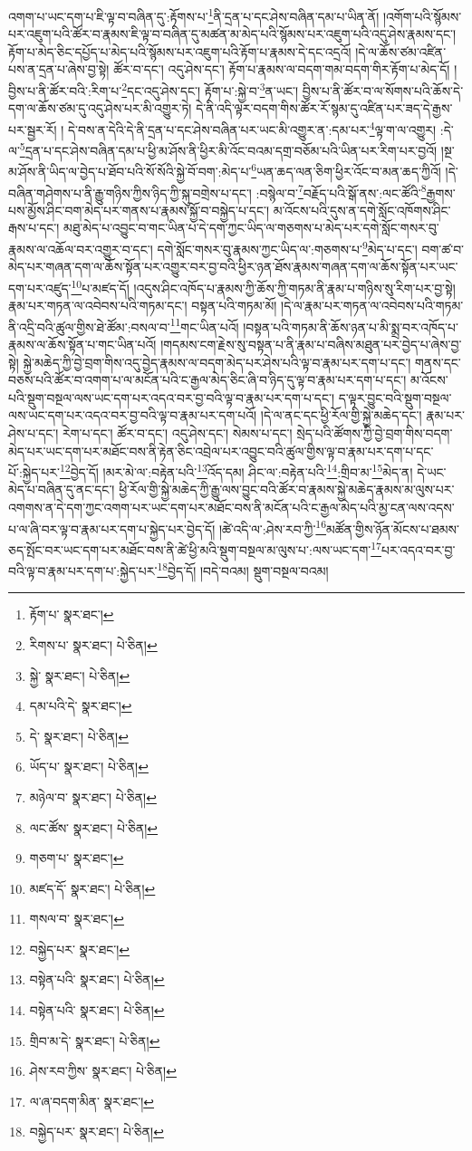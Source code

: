 འགག་པ་ཡང་དག་པ་ཇི་ལྟ་བ་བཞིན་དུ་:རྟོགས་པ་\footnote{རྟོག་པ་  སྣར་ཐང་། }ནི་དྲན་པ་དང་ཤེས་བཞིན་དམ་པ་ཡིན་ནོ། །འགོག་པའི་སྙོམས་པར་འཇུག་པའི་ཚོར་བ་རྣམས་ཇི་ལྟ་བ་བཞིན་དུ་མཚན་མ་མེད་པའི་སྙོམས་པར་འཇུག་པའི་འདུ་ཤེས་རྣམས་དང་། རྟོག་པ་མེད་ཅིང་དཔྱོད་པ་མེད་པའི་སྙོམས་པར་འཇུག་པའི་རྟོག་པ་རྣམས་དེ་དང་འདྲའོ། །དེ་ལ་ཆོས་ཙམ་འཛིན་པས་ན་དྲན་པ་ཞེས་བྱ་སྟེ། ཚོར་བ་དང་། འདུ་ཤེས་དང་། རྟོག་པ་རྣམས་ལ་བདག་གམ་བདག་གིར་རྟོག་པ་མེད་དོ། །བྱིས་པ་ནི་ཚོར་བའི་:རིག་པ་\footnote{རིགས་པ་  སྣར་ཐང་།  པེ་ཅིན། }དང་འདུ་ཤེས་དང་། རྟོག་པ་:སྐྱེ་བ་\footnote{སྐྱེ་  སྣར་ཐང་།  པེ་ཅིན། }ན་ཡང་། བྱིས་པ་ནི་ཚོར་བ་ལ་སོགས་པའི་ཆོས་དེ་དག་ལ་ཆོས་ཙམ་དུ་འདུ་ཤེས་པར་མི་འགྱུར་ཏེ། དེ་ནི་འདི་ལྟར་བདག་གིས་ཚོར་རོ་སྙམ་དུ་འཛིན་པར་ཟད་དེ་རྒྱས་པར་སྦྱར་རོ། །
དེ་བས་ན་དེའི་དེ་ནི་དྲན་པ་དང་ཤེས་བཞིན་པར་ཡང་མི་འགྱུར་ན་:དམ་པར་\footnote{དམ་པའི་དེ་  སྣར་ཐང་། }ལྟ་ག་ལ་འགྱུར། :དེ་ལ་\footnote{དེ་  སྣར་ཐང་།  པེ་ཅིན། }དྲན་པ་དང་ཤེས་བཞིན་དམ་པ་ཕྱི་མ་ཤོས་ནི་ཕྱིར་མི་འོང་བའམ་དགྲ་བཅོམ་པའི་ཡིན་པར་རིག་པར་བྱའོ། །སྔ་མ་ཤོས་ནི་ཡིད་ལ་བྱེད་པ་ཐོབ་པའི་སོ་སོའི་སྐྱེ་བོ་བག་:མེད་པ་\footnote{ཡོད་པ་  སྣར་ཐང་།  པེ་ཅིན། }ཡན་ཆད་ལན་ཅིག་ཕྱིར་འོང་བ་མན་ཆད་ཀྱིའོ། །དེ་བཞིན་གཤེགས་པ་ནི་རྒྱུ་གཉིས་ཀྱིས་ཉིད་ཀྱི་སྐུ་བགྲེས་པ་དང་། :བསྙེལ་བ་\footnote{མཉེལ་བ་  སྣར་ཐང་།  པེ་ཅིན། }བརྗོད་པའི་སྒོ་ནས་:ལང་ཚོའི་\footnote{ལང་ཚོས་  སྣར་ཐང་།  པེ་ཅིན། }རྒྱགས་པས་མྱོས་ཤིང་བག་མེད་པར་གནས་པ་རྣམས་སྐྱོ་བ་བསྐྱེད་པ་དང་། མ་འོངས་པའི་དུས་ན་དགེ་སློང་འཁོགས་ཤིང་རྒས་པ་དང་། མཐུ་མེད་པ་འབྱུང་བ་གང་ཡིན་པ་དེ་དག་ཀྱང་ཡིད་ལ་གཅགས་པ་མེད་པར་དགེ་སློང་གསར་བུ་རྣམས་ལ་འཆོལ་བར་འགྱུར་བ་དང་། དགེ་སློང་གསར་བུ་རྣམས་ཀྱང་ཡིད་ལ་:གཅགས་པ་\footnote{གཅག་པ་  སྣར་ཐང་། }མེད་པ་དང་། བག་ཚ་བ་མེད་པར་གཞན་དག་ལ་ཆོས་སྟོན་པར་འགྱུར་བར་བྱ་བའི་ཕྱིར་ཉན་ཐོས་རྣམས་གཞན་དག་ལ་ཆོས་སྟོན་པར་ཡང་དག་པར་འཛུད་\footnote{མཛད་དོ་  སྣར་ཐང་།  པེ་ཅིན། }པ་མཛད་དོ། །འདུས་ཤིང་འཁོད་པ་རྣམས་ཀྱི་ཆོས་ཀྱི་གཏམ་ནི་རྣམ་པ་གཉིས་སུ་རིག་པར་བྱ་སྟེ། རྣམ་པར་གཏན་ལ་འབེབས་པའི་གཏམ་དང་། བསྟན་པའི་གཏམ་མོ། །དེ་ལ་རྣམ་པར་གཏན་ལ་འབེབས་པའི་གཏམ་ནི་འདྲི་བའི་ཚུལ་གྱིས་ཐེ་ཚོམ་:བསལ་བ་\footnote{གསལ་བ་  སྣར་ཐང་། }གང་ཡིན་པའོ། །བསྟན་པའི་གཏམ་ནི་ཆོས་ཉན་པ་མི་སྨྲ་བར་འཁོད་པ་རྣམས་ལ་ཆོས་སྟོན་པ་གང་ཡིན་པའོ། །གདམས་ངག་རྗེས་སུ་བསྟན་པ་ནི་རྣམ་པ་བཞིས་མཐུན་པར་བྱེད་པ་ཞེས་བྱ་སྟེ། སྐྱེ་མཆེད་ཀྱི་བྱེ་བྲག་གིས་འདུ་བྱེད་རྣམས་ལ་བདག་མེད་པར་ཤེས་པའི་ལྟ་བ་རྣམ་པར་དག་པ་དང་། གནས་དང་བཅས་པའི་ཚོར་བ་འགག་པ་ལ་མངོན་པའི་ང་རྒྱལ་མེད་ཅིང་ཞི་བ་ཉིད་དུ་ལྟ་བ་རྣམ་པར་དག་པ་དང་། མ་འོངས་པའི་སྡུག་བསྔལ་ལས་ཡང་དག་པར་འདའ་བར་བྱ་བའི་ལྟ་བ་རྣམ་པར་དག་པ་དང་། ད་ལྟར་བྱུང་བའི་སྡུག་བསྔལ་ལས་ཡང་དག་པར་འདའ་བར་བྱ་བའི་ལྟ་བ་རྣམ་པར་དག་པའོ། །དེ་ལ་ནང་དང་ཕྱི་རོལ་གྱི་སྐྱེ་མཆེད་དང་། རྣམ་པར་ཤེས་པ་དང་། རེག་པ་དང་། ཚོར་བ་དང་། འདུ་ཤེས་དང་། སེམས་པ་དང་། སྲེད་པའི་ཚོགས་ཀྱི་བྱེ་བྲག་གིས་བདག་མེད་པར་ཡང་དག་པར་མཐོང་བས་ནི་རྟེན་ཅིང་འབྲེལ་པར་འབྱུང་བའི་ཚུལ་གྱིས་ལྟ་བ་རྣམ་པར་དག་པ་དང་པོ་:སྐྱེད་པར་\footnote{བསྐྱེད་པར་  སྣར་ཐང་། }བྱེད་དོ། །མར་མེ་ལ་:བརྟེན་པའི་\footnote{བསྟེན་པའི་  སྣར་ཐང་།  པེ་ཅིན། }འོད་དམ། ཤིང་ལ་:བརྟེན་པའི་\footnote{བསྟེན་པའི་  སྣར་ཐང་།  པེ་ཅིན། }:གྲིབ་མ་\footnote{གྲིབ་མ་དེ་  སྣར་ཐང་།  པེ་ཅིན། }མེད་ན། དེ་ཡང་མེད་པ་བཞིན་དུ་ནང་དང་། ཕྱི་རོལ་གྱི་སྐྱེ་མཆེད་ཀྱི་རྒྱུ་ལས་བྱུང་བའི་ཚོར་བ་རྣམས་སྐྱེ་མཆེད་རྣམས་མ་ལུས་པར་འགགས་ན་དེ་དག་ཀྱང་འགག་པར་ཡང་དག་པར་མཐོང་བས་ནི་མངོན་པའི་ང་རྒྱལ་མེད་པའི་མྱ་ངན་ལས་འདས་པ་ལ་ཞི་བར་ལྟ་བ་རྣམ་པར་དག་པ་སྐྱེད་པར་བྱེད་དོ། །ཚེ་འདི་ལ་:ཤེས་རབ་ཀྱི་\footnote{ཤེས་རབ་ཀྱིས་  སྣར་ཐང་།  པེ་ཅིན། }མཚོན་གྱིས་ཉོན་མོངས་པ་ཐམས་ཅད་སྤོང་བར་ཡང་དག་པར་མཐོང་བས་ནི་ཚེ་ཕྱི་མའི་སྡུག་བསྔལ་མ་ལུས་པ་:ལས་ཡང་དག་\footnote{ལ་ཞ་བདག་མིན་  སྣར་ཐང་། }པར་འདའ་བར་བྱ་བའི་ལྟ་བ་རྣམ་པར་དག་པ་:སྐྱེད་པར་\footnote{བསྐྱེད་པར་  སྣར་ཐང་།  པེ་ཅིན། }བྱེད་དོ། །བདེ་བའམ། སྡུག་བསྔལ་བའམ། 